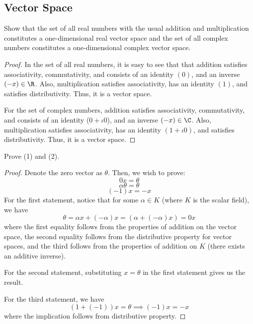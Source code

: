 \subsection{Vector Space}

\begin{question}
    Show that the set of all real numbers with the usual addition and multiplication constitutes a one-dimensional real vector space and the set of all complex numbers constitutes a one-dimensional complex vector space.
    \label{section2.1-1}
\end{question}

\begin{proof}
    In the set of all real numbers, it is easy to see that that addition satisfies associativity, commutativity, and consists of an identity $(0)$, and an inverse $(-x) \in \R$. Also, multiplication satisfies associativity, has an identity $(1)$, and satisfies distributivity. Thus, it is a vector space. 

    For the set of complex numbers, addition satisfies associativity, commutativity, and consists of an identity ($0 + \iota 0$), and an inverse $(-x) \in \C$. Also, multiplication satisfies associativity, has an identity $(1 + \iota 0)$, and satisfies distributivity. Thus, it is a vector space. 
\end{proof}

\begin{question}
    Prove (1) and (2).
    \label{section2.1-2}
\end{question}
\begin{proof}
    Denote the zero vector as $\theta.$ Then, we wish to prove:
    \[0x = \theta\]
    \[\alpha \theta = \theta\]
    \[(-1)x = -x\]
    For the first statement, notice that for some $\alpha \in K$ (where $K$ is the scalar field), we have
    \[\theta = \alpha x + (-\alpha) x = (\alpha + (-\alpha)x
    ) = 0x \]
    where the first equality follows from the properties of addition on the vector space, the second equality follows from the distributive property for vector spaces, and the third follows from the properties of addition on $K$ (there exists an additive inverse).

    For the second statement, substituting $x = \theta$ in the first statement gives us the result.

    For the third statement, we have
    \[(1 + (-1))x = \theta \implies (-1)x = -x\]
    where the implication follows from distributive property.
\end{proof}

